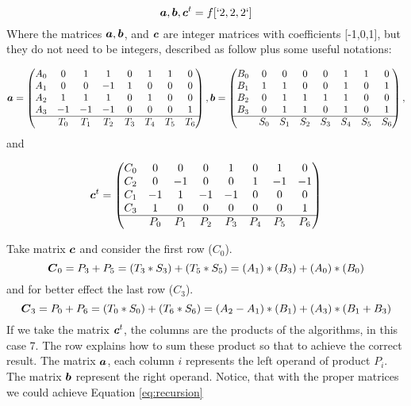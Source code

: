 \documentclass[acmsmall]{acmart}
\begin{document}
\begin{equation} 
  {\boldsymbol a}, {\boldsymbol b}, {\boldsymbol c}^t = f[`2,2,2`] \\
\end{equation}
Where the matrices ${\boldsymbol a}, {\boldsymbol b}$, and ${\boldsymbol c}$ are integer matrices
with coefficients [-1,0,1], but they do not need to be integers,
described as follow plus some useful notations:

\begin{equation}
  {\boldsymbol a}= 
  \begin{pmatrix}
    A_0 & 0   & 1  & 1 &  0 &  1&  1&  0 \\
    A_1 & 0   & 0  &-1 &  1 &  0&  0&  0 \\ 
    A_2 & 1   & 1  & 1 &  0 &  1&  0&  0 \\
    A_3 &-1   &-1  &-1 &  0 &  0&  0&  1 \\ \hline
        & T_0 &T_1 &T_2 &T_3&T_4 &T_5&T_6 \\
  \end{pmatrix},
  {\boldsymbol b}= 
  \begin{pmatrix}
    B_0 &0   & 0 & 0 & 0 & 1 & 1 & 0 \\
    B_1 &1   & 1 & 0 & 0 & 1 & 0 & 1 \\
    B_2 &0   & 1 & 1 & 1 & 1 & 0 & 0 \\
    B_3 &0   & 1 & 1 & 0 & 1 & 0 & 1 \\ \hline
        &S_0 &S_1&S_2&S_3 &S_4&S_5&S_6 \\
  \end{pmatrix},
\end{equation}
and

\begin{equation}
  {\boldsymbol c}^t =
  \begin{pmatrix}
    C_0 &  0&  0&  0&  1&  0&  1&  0 \\
    C_2 &  0& -1&  0&  0&  1& -1& -1 \\
    C_1 & -1&  1& -1& -1&  0&  0&  0 \\
    C_3 &  1&  0&  0&  0&  0&  0&  1 \\ \hline
        &P_0&P_1&P_2&P_3 &P_4&P_5&P_6 \\
  \end{pmatrix} 
\end{equation}

Take matrix ${\boldsymbol c}$ and consider the first row ($C_0$).
\begin{equation}
  {\boldsymbol C}_0 = P_3+P_5 = (T_3*S_3) + (T_5*S_5) = (A_1)*(B_3) + (A_0)*(B_0)
\end{equation}
and for better effect the last row ($C_3$).
\begin{equation}
  {\boldsymbol C}_3 = P_0+P_6 = (T_0*S_0) + (T_6*S_6) = (A_2-A_1)*(B_1) + (A_3)*(B_1+B_3)
\end{equation}
If we take the matrix ${\boldsymbol c}^t$, the columns are the products of the
algorithms, in this case 7. The row explains how to sum these product
so that to achieve the correct result. The matrix ${\boldsymbol a}$, each
column $i$ represents the left operand of product $P_i$. The matrix
${\boldsymbol b}$ represent the right operand. Notice, that with the proper
matrices we could achieve Equation \ref{eq:recursion} 
\end{document}
